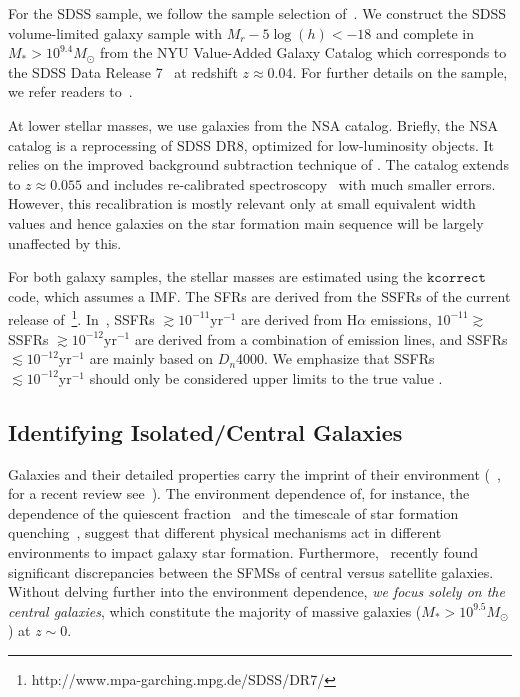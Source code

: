\documentclass[preprint2,tighten]{aastex62}
\newcommand{\todo}[1]{{\bf \textcolor{red}{ #1}}}
\begin{document}
For the SDSS sample, we follow the sample selection of~\cite{tinker2011}. 
We construct the SDSS volume-limited galaxy sample with $M_r - 5\log(h) < -18$ 
and complete in $M_* > 10^{9.4} M_\odot$ from the NYU Value-Added 
Galaxy Catalog \citep[VAGC;][]{blanton2005} which corresponds to 
the SDSS Data Release 7~\citep[DR7;][]{abazajian2009} at redshift 
$z \approx 0.04$. For further details on the sample, we refer readers 
to~\cite{tinker2011,wetzel2013,hahn2017}.

At lower stellar masses, we use galaxies from the NSA catalog. Briefly, 
the NSA catalog is a reprocessing of SDSS DR8, optimized for low-luminosity 
objects. It relies on the improved background subtraction technique of 
\cite{blanton2011}. The catalog extends to $z \approx 0.055$ and includes 
re-calibrated spectroscopy~\citep{yan2011,yan2012} with much
smaller errors. However, this recalibration is mostly relevant only at small 
equivalent width values and hence galaxies on the star formation main 
sequence will be largely unaffected by this.

For both galaxy samples, the stellar masses are estimated using the 
\citet{blanton2007} $\mathtt{kcorrect}$ code, which assumes a 
\citep{chabrier2003} IMF. The SFRs are derived from the SSFRs of the 
current release of~\citet{brinchmann2004}\footnote{http://www.mpa-garching.mpg.de/SDSS/DR7/}. 
In~\citet{brinchmann2004}, SSFRs 
$\gtrsim 10^{-11} \mathrm{yr}^{-1}$ are  derived from $\mathrm{H}\alpha$ 
emissions, $10^{-11}\gtrsim$ SSFRs $\gtrsim 10^{-12} \mathrm{yr}^{-1}$ 
are derived from a combination of emission lines, and SSFRs 
$\lesssim 10^{-12} \mathrm{yr}^{-1}$ are mainly based on $D_n4000$. 
We emphasize that SSFRs $\lesssim 10^{-12} \mathrm{yr}^{-1}$ should only be 
considered upper limits to the true value \citep{salim2007}.

\subsection{Identifying Isolated/Central Galaxies}
Galaxies and their detailed properties carry the 
imprint of their environment (~\citealt{hubble1936, oemler1974, dressler1980, guzzo1997}, 
for a recent review see~\citealp{blanton2009}). The environment
dependence of, for instance, the dependence of the quiescent 
fraction~\citep[\emph{e.g.}][\todo{more citations}]{peng2010,hahn2015}
and the timescale of star formation quenching~\citep{wetzel2013,hahn2017a}, 
suggest that different physical mechanisms act in different environments 
to impact galaxy star formation. Furthermore,~\cite{wang2018} recently 
found significant discrepancies between the SFMSs of central versus 
satellite galaxies. Without delving further into the environment dependence,  
\emph{we focus solely on the central galaxies}, which constitute the majority
of massive galaxies ($M_* > 10^{9.5}M_\odot$) at $z \sim 0$. 
\end{document}
